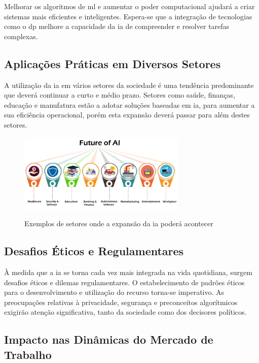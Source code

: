 \documentclass{report}
\begin{document}
	Melhorar os algoritmos de \ac{ml} e aumentar o poder computacional ajudará a criar sistemas mais eficientes e inteligentes.
	Espera-se que a integração de tecnologias como o \ac{dp} melhore a capacidade da \ac{ia} de compreender e resolver tarefas complexas. \cite{emergentes1} \cite{emergentes2}

\subsection{Aplicações Práticas em Diversos Setores}
\label{subsec.aplicacoes}

A utilização da \ac{ia} em vários setores da sociedade é uma tendência predominante que deverá continuar a curto e médio prazo. Setores como saúde, finanças, educação e manufatura estão a adotar soluções baseadas em \ac{ia}, para aumentar a sua eficiência operacional, porém esta expansão deverá passar para além destes setores. \cite{praticas1} \cite{praticas2}

\begin{figure}[H]
\caption{Exemplos de setores onde a expansão da \ac{ia} poderá acontecer}
\centering
\includegraphics[width=8cm]{imagens/future.png}
\label{future}
\end{figure}

\nocite{future}

\subsection{Desafios Éticos e Regulamentares}
\label{subsec.desafios}

	À medida que a \ac{ia} se torna cada vez mais integrada na vida quotidiana, surgem desafios éticos e dilemas regulamentares. O estabelecimento de padrões éticos para o desenvolvimento e utilização do recurso torna-se imperativo. As preocupações relativas à privacidade, segurança e preconceitos algorítmicos exigirão atenção significativa, tanto da sociedade como dos decisores políticos. \cite{etica}

\subsection{Impacto nas Dinâmicas do Mercado de Trabalho}
\label{subsec.impacto}
\end{document}
